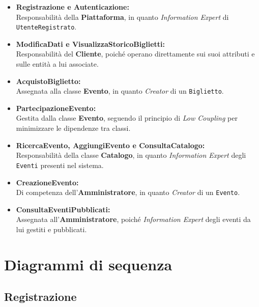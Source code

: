 \vspace{-0.5em} %
\begin{itemize}\setlength\itemsep{0.4em} %
    \item \textbf{Registrazione e Autenticazione:} \\
    Responsabilità della \textbf{Piattaforma}, in quanto \emph{Information Expert} di \texttt{UtenteRegistrato}.
    
    \item \textbf{ModificaDati e VisualizzaStoricoBiglietti:} \\
    Responsabilità del \textbf{Cliente}, poiché operano direttamente sui suoi attributi e sulle entità a lui associate.
    
    \item \textbf{AcquistoBiglietto:} \\
    Assegnata alla classe \textbf{Evento}, in quanto \emph{Creator} di un \texttt{Biglietto}.
    
    \item \textbf{PartecipazioneEvento:} \\
    Gestita dalla classe \textbf{Evento}, seguendo il principio di \emph{Low Coupling} per minimizzare le dipendenze tra classi.
    
    \item \textbf{RicercaEvento, AggiungiEvento e ConsultaCatalogo:} \\
    Responsabilità della classe \textbf{Catalogo}, in quanto \emph{Information Expert} degli \texttt{Eventi} presenti nel sistema.
    
    \item \textbf{CreazioneEvento:} \\
    Di competenza dell'\textbf{Amministratore}, in quanto \emph{Creator} di un \texttt{Evento}.
    
    \item \textbf{ConsultaEventiPubblicati:} \\
    Assegnata all'\textbf{Amministratore}, poiché \emph{Information Expert} degli eventi da lui gestiti e pubblicati.
\end{itemize}


\section{Diagrammi di sequenza}
\subsection{Registrazione}

